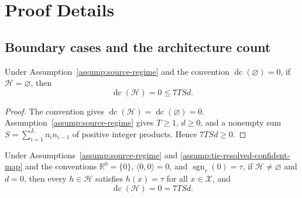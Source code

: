 \appendix

\section{Proof Details}
\label{sec:proof-details}

\subsection{Boundary cases and the architecture count}
\label{app:step-001}

\begin{proposition}
\label{prop:step-001-empty}
Under Assumption~\ref{assump:source-regime} and the convention
$\operatorname{dc}(\varnothing)=0$, if $\mathcal H=\varnothing$, then
\[
\operatorname{dc}(\mathcal H)=0\leq7TSd.
\]
\end{proposition}

\begin{proof}
The convention gives
$\operatorname{dc}(\mathcal H)=\operatorname{dc}(\varnothing)=0$.
Assumption~\ref{assump:source-regime} gives $T\geq1$, $d\geq0$, and a
nonempty sum $S=\sum_{i=1}^L n_i n_{i-1}$ of positive integer products.
Hence $7TSd\geq0$.
\end{proof}

\begin{lemma}
\label{lem:step-001-zero}
Under Assumptions~\ref{assump:source-regime} and
\ref{assump:tie-resolved-confident-map} and the conventions
$\mathbb R^0=\{0\}$, $\langle0,0\rangle=0$, and
$\operatorname{sgn}_{\tau}(0)=\tau$, if $\mathcal H\neq\varnothing$ and
$d=0$, then every $h\in\mathcal H$ satisfies $h(x)=\tau$ for all
$x\in\mathcal X$, and
\[
\operatorname{dc}(\mathcal H)=0=7TSd.
\]
\end{lemma}

